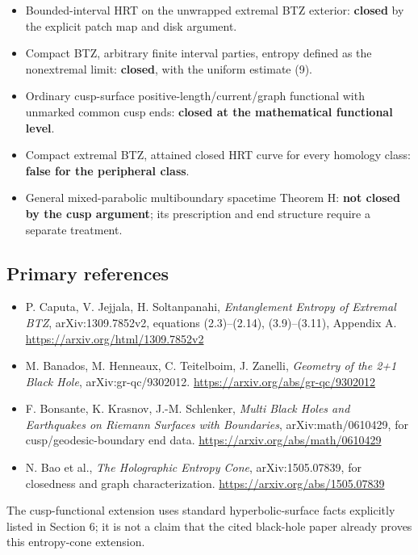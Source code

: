 \documentclass[11pt]{article}
\providecommand{\tightlist}{\setlength{\itemsep}{1pt}\setlength{\parskip}{0pt}}
\begin{document}
\begin{itemize}
\tightlist
\item
  Bounded-interval HRT on the unwrapped extremal BTZ exterior:
  \textbf{closed} by the explicit patch map and disk argument.
\item
  Compact BTZ, arbitrary finite interval parties, entropy defined as the
  nonextremal limit: \textbf{closed}, with the uniform estimate (9).
\item
  Ordinary cusp-surface positive-length/current/graph functional with
  unmarked common cusp ends: \textbf{closed at the mathematical
  functional level}.
\item
  Compact extremal BTZ, attained closed HRT curve for every homology
  class: \textbf{false for the peripheral class}.
\item
  General mixed-parabolic multiboundary spacetime Theorem H: \textbf{not
  closed by the cusp argument}; its prescription and end structure
  require a separate treatment.
\end{itemize}

\subsection{Primary references}\label{primary-references-2}

\begin{itemize}
\tightlist
\item
  P. Caputa, V. Jejjala, H. Soltanpanahi, \emph{Entanglement Entropy of
  Extremal BTZ}, arXiv:1309.7852v2, equations (2.3)--(2.14),
  (3.9)--(3.11), Appendix A. \url{https://arxiv.org/html/1309.7852v2}
\item
  M. Banados, M. Henneaux, C. Teitelboim, J. Zanelli, \emph{Geometry of
  the 2+1 Black Hole}, arXiv:gr-qc/9302012.
  \url{https://arxiv.org/abs/gr-qc/9302012}
\item
  F. Bonsante, K. Krasnov, J.-M. Schlenker, \emph{Multi Black Holes and
  Earthquakes on Riemann Surfaces with Boundaries}, arXiv:math/0610429,
  for cusp/geodesic-boundary end data.
  \url{https://arxiv.org/abs/math/0610429}
\item
  N. Bao et al., \emph{The Holographic Entropy Cone}, arXiv:1505.07839,
  for closedness and graph characterization.
  \url{https://arxiv.org/abs/1505.07839}
\end{itemize}

The cusp-functional extension uses standard hyperbolic-surface facts
explicitly listed in Section 6; it is not a claim that the cited
black-hole paper already proves this entropy-cone extension.
\end{document}
